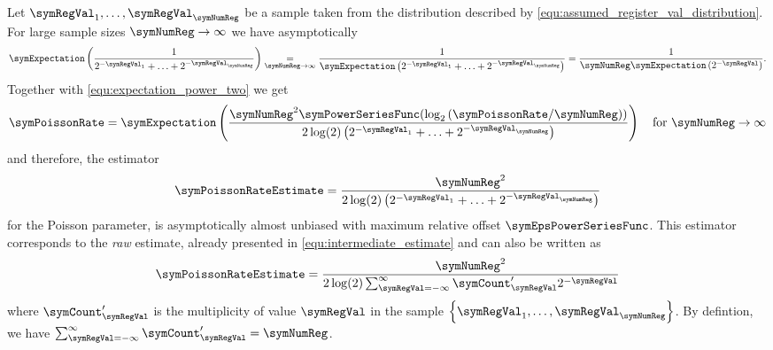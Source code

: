 \documentclass[a4paper]{scrartcl}
\begin{document}
Let $\symRegVal_1,\ldots,\symRegVal_\symNumReg$ be a sample taken from the distribution described by \eqref{equ:assumed_register_val_distribution}. For large sample sizes $\symNumReg\rightarrow \infty$ we have asymptotically
\begin{equation}
\label{equ:expectation_power_two}
\symExpectation\left(
\frac{1}{2^{-\symRegVal_1}+\ldots+2^{-\symRegVal_\symNumReg}}
\right)
\underset{\symNumReg\rightarrow \infty}{=}
\frac{1}{\symExpectation
\left(2^{-\symRegVal_1}+\ldots+2^{-\symRegVal_\symNumReg}\right)}
=
\frac{1}{\symNumReg \symExpectation\left(2^{-\symRegVal}\right)}.
\end{equation}
Together with \eqref{equ:expectation_power_two} we get
\begin{equation}
\symPoissonRate
=
\symExpectation\left(
\frac{\symNumReg^2 \symPowerSeriesFunc\!\left(\log_2\left( \symPoissonRate/\symNumReg\right)\right)}{2\log(2)\left(2^{-\symRegVal_1}+\ldots+2^{-\symRegVal_\symNumReg}\right)}
\right)
\quad
\text{for $\symNumReg\rightarrow \infty$} 
\end{equation}
and therefore, the estimator
\begin{equation}
\label{equ:rawestimator_2}
\symPoissonRateEstimate 
= 
\frac{\symNumReg^2}{2\log(2)\left(2^{-\symRegVal_1}+\ldots+2^{-\symRegVal_\symNumReg}\right)}
\end{equation}
for the Poisson parameter, is asymptotically almost unbiased with maximum relative offset $\symEpsPowerSeriesFunc$. This estimator corresponds to the \emph{raw} estimate, already presented in \eqref{equ:intermediate_estimate} and can also be written as 
\begin{equation}
\label{equ:raw_estimate_with_multiplicities}
\symPoissonRateEstimate 
= 
\frac{\symNumReg^2}{2\log(2)\sum_{\symRegVal=-\infty}^\infty \symCount'_\symRegVal 2^{-\symRegVal}}
\end{equation}
where $\symCount'_\symRegVal$ is the multiplicity of value $\symRegVal$ in the sample $\left\lbrace \symRegVal_1,\ldots,\symRegVal_\symNumReg\right\rbrace$. By defintion, we have $\sum_{\symRegVal=-\infty}^\infty \symCount'_\symRegVal = \symNumReg$. 
\end{document}
